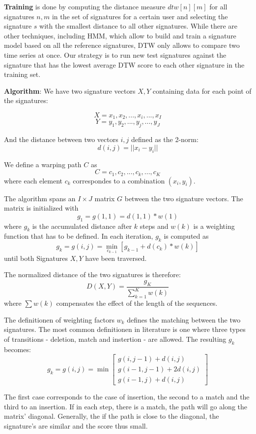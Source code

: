 \documentclass[a4paper, oneside]{csthesis}
\begin{document}
\textbf{Training} is done by computing the distance measure $dtw[n][m]$ for all signatures $n, m$ in the set of signatures for a certain user and selecting the signature $s$ with the smallest distance to all other signatures. While there are other techniques, including HMM, which allow to build and train a signature model based on all the reference signatures, DTW only allows to compare two time series at once. Our strategy is to run new test signatures against the signature that has the lowest average DTW score to each other signature in the training set.


\textbf{Algorithm}: We have two signature vectors $X,Y$ containing data for each point of the signatures:

$$X = x_1, x_2, ... , x_i, ... , x_I$$ $$Y = y_1, y_2, ..., y_j, ..., y_J$$

And the distance between two vectors $i,j$ defined as the 2-norm: $$d(i,j) = ||x_i - y_i||$$

We define a warping path $C$ as $$ C = c_1, c_2, ..., c_k, ..., c_K $$ where each element $c_k$ correspondes to a combination $(x_i, y_i)$.

The algorithm spans an $I \times J$ matrix $G$ between the two signature vectors. The matrix is initialized with $$g_1 = g(1,1) = d(1,1) * w(1)$$ where $g_k$ is the accumulated distance after $k$ steps and $w(k)$ is a weighting function that has to be defined.
In each iteration, $g_k$ is computed as $$g_k = g(i,j) = \min\limits_{c_{k-1}} [g_{k-1}+d(c_k) * w(k)]$$ until both Signatures $X,Y$ have been traversed.

The normalized distance of the two signatures is therefore: $$D(X,Y) = \frac{g_K}{\sum_{k=1}^K w(k)}$$ where $\sum w(k)$ compensates the effect of the length of the sequences.

The definitionen of weighting factors $w_k$ defines the matching between the two signatures. The most common definitionen in literature is one where three types of transitions - deletion, match and instertion - are allowed. The resulting $g_k$ becomes:
$$g_k = g(i,j) = \min \left[\begin{array}{c}g(i,j-1) + d(i,j) \\g(i-1,j-1)+ 2 d(i,j) \\g(i-1,j) + d(i,j)\end{array}\right]$$

The first case corresponds to the case of insertion, the second to a match and the third to an insertion. If in each step, there is a match, the path will go along the matrix' diagonal. Generally, the if the path is close to the diagonal, the signature's are similar and the score thus small.
\end{document}
